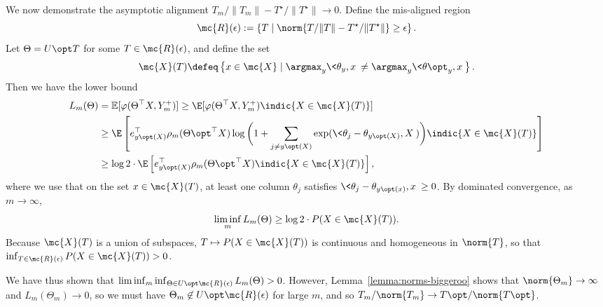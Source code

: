 \documentclass[11pt]{article}
\newcommand{\Ep}{\mathbb{E}}
\newcommand{\sloss}{\varphi}  %
\begin{document}
We now demonstrate the asymptotic
alignment $T_m/\|T_m\| - T^\star / \|T^\star\| \to 0$.
%
Define the mis-aligned region
\begin{equation*}
  \mc{R}(\epsilon) := \left\{T \mid
  \norm{ T/\|T\| - T^\star / \|T^\star\|}
  \geq \epsilon \right\}.
\end{equation*}
Let $\Theta = U\opt T$ for some $T \in \mc{R}(\epsilon)$, and
define the set
\begin{equation*}
  \mc{X}(T)
  \defeq
  \left\{x \in \mc{X} \mid \argmax_y \<\theta_y, x\> \neq \argmax_y
  \<\theta\opt_y, x\> \right\}.
\end{equation*}
Then we have the lower bound
\begin{align*}
  L_m(\Theta)
  & = \Ep [\sloss(\Theta^\top X, Y_m^+)]
  \ge \E[\sloss(\Theta^\top X, Y_m^+) \indic{X \in \mc{X}(T)}] \\
  & \ge \E\left[e_{y\opt(X)}^\top \rho_m({\Theta\opt}^\top X)
    \log\bigg(1 + \sum_{j \neq y\opt(X)}
    \exp(\<\theta_j - \theta_{y\opt(X)}, X\>)\bigg)
    \indic{X \in \mc{X}(T)} \right] \\
  & \ge \log 2 \cdot \E\left[e_{y\opt(X)}^\top \rho_m({\Theta\opt}^\top X)
    \indic{X \in \mc{X}(T)}\right],
\end{align*}
where we use that on the set $x \in \mc{X}(T)$,
at least one column $\theta_j$ satisfies
$\<\theta_j - \theta_{y\opt(x)}, x\> \ge 0$.
%
By dominated convergence, as $m \to \infty$,
\begin{equation*}
  \liminf_m L_m(\Theta)
  \ge \log 2 \cdot P(X \in \mc{X}(T)).
\end{equation*}
Because $\mc{X}(T)$ is a union of subspaces,
$T \mapsto P(X \in \mc{X}(T))$ is continuous and homogeneous in $\norm{T}$,
so that $\inf_{T \in \mc{R}(\epsilon)} P(X \in \mc{X}(T)) > 0$.

We have thus shown that
$\liminf_m \inf_{\Theta \in U\opt \mc{R}(\epsilon)}
L_m(\Theta) > 0$.
%
However, Lemma~\ref{lemma:norms-biggeroo}
shows that $\norm{\Theta_m} \to \infty$ and
$L_m(\Theta_m) \to 0$, so we must have
$\Theta_m \not \in U\opt \mc{R}(\epsilon)$ for large $m$,
and so $T_m / \norm{T_m} \to T\opt / \norm{T\opt}$.






\end{document}
